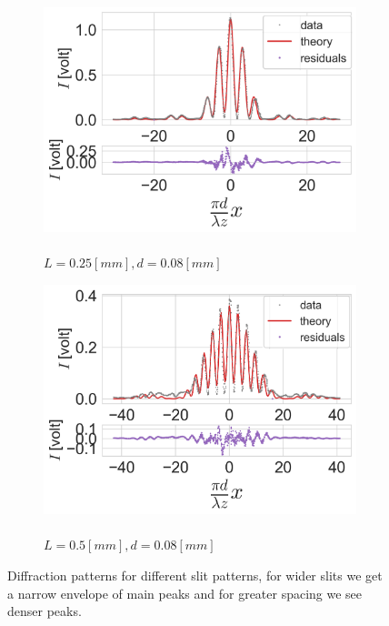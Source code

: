 \begin{figure}[H]
    \centering
    \begin{subfigure}{0.5\columnwidth}
        \centering
        \includegraphics[width=\columnwidth]{figures/0.08w0.25s.png} %
        \caption{\\$L=0.25[mm],d=0.08[mm]$}
        \label{fig:double slit interference 0.08w0.25s}
    \end{subfigure}\hfill
    \begin{subfigure}{0.5\columnwidth}
        \centering
        \includegraphics[width=\columnwidth]{figures/0.08w0.5s.png} %
        \caption{\\$L=0.5[mm],d=0.08[mm]$}
        \label{fig:double slit interference 0.080.5s}
    \end{subfigure}
    \caption{Diffraction patterns for different slit patterns, for wider slits we get a narrow envelope of main peaks and for greater spacing we see denser peaks.}
    \label{other doubles}
\end{figure}